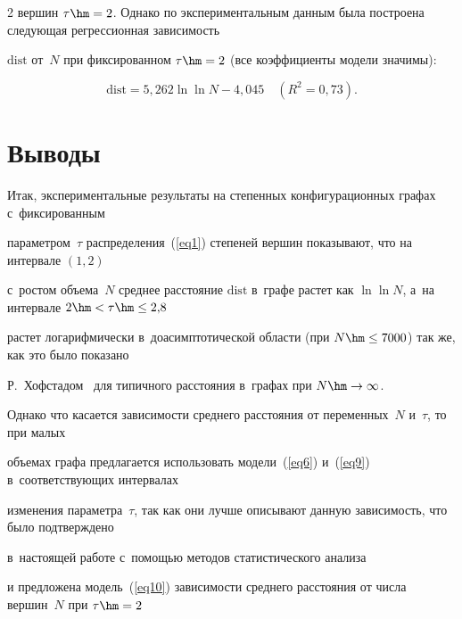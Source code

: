 \begin{multicols}{2}
вершин $\tau\hm=2$. Однако по экспериментальным данным была по\-стро\-ена сле\-ду\-ющая регрессионная за\-ви\-си\-мость

$\mathrm{dist}$ от~$N$ при фиксированном $\tau\hm=2$ (все коэффициенты модели значимы):

\begin{equation}

\label{eq10}

\mathrm{dist} = 5{,}262\ln\ln N - 4{,}045 \quad \left(R^2=0{,}73\right).

\end{equation}



\vspace*{-14.5pt}



\section{Выводы}



\vspace*{-2.5pt}



Итак, экспериментальные результаты на степенных конфигурационных графах с~фиксированным

па\-ра\-мет\-ром~$\tau$ распределения~(\ref{eq1}) степеней вершин показывают, что на интервале $(1,2)$ 

с~рос\-том объема~$N$ среднее расстояние $\mathrm{dist}$ в~графе рас\-тет как $\ln\ln N$, а~на интервале $2\hm<\tau\hm\leq 2{,}8$

рас\-тет логарифмически в~доасимптотической об\-ласти (при $N\hm\leq 7000$) так же, как это было показано

Р.~Хофстадом~\cite{Hof2} для типичного расстояния в~графах при $N\hm\rightarrow\infty$.

Однако что касается за\-ви\-си\-мости среднего расстояния от переменных~$N$ и~$\tau$, то при малых

объемах графа предлагается использовать модели~(\ref{eq6}) и~(\ref{eq9}) в~соответствующих интервалах

изменения параметра~$\tau$, так как они лучше описывают данную за\-ви\-си\-мость, что было под\-тверж\-де\-но

в~настоящей работе с~по\-мощью методов статистического анализа

и предложена модель~(\ref{eq10}) за\-ви\-си\-мости сред\-не\-го рас\-сто\-яния от чис\-ла вершин~$N$ при $\tau\hm=2$


\end{multicols}
